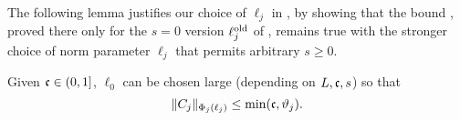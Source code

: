 The following lemma justifies our choice of $\ell_j$
in , by showing that the
bound \cite[\eqref{IE-e:CLbd}]{BS-rg-IE}, proved there only for the $s=0$ version
$\ell_j^{\mathrm{old}}$ of ,
remains true with the stronger
choice of norm parameter $\ell_j$ that permits arbitrary $s \ge 0$.

\begin{lemma}
\label{lem:Cbd}
Given $\mathfrak{c} \in (0, 1]$, $\ell_0$ can be chosen large (depending on $L,\mathfrak{c},s$)
so that
\begin{equation}
\lbeq{Cbd}
\|C_j\|_{\Phi_{j}(\ell_j)} \leq \min(\ellconst, \chicCov_j).
\end{equation}
\end{lemma}


